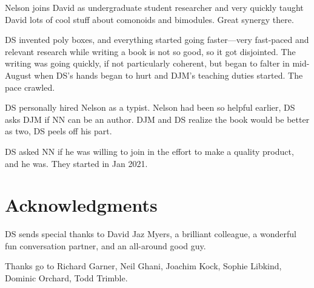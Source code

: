 \documentclass[Book-Poly]{subfiles}
\begin{document}
Nelson joins David as undergraduate student researcher and very quickly taught David lots of cool stuff about comonoids and bimodules. Great synergy there. 

DS invented poly boxes, and everything started going faster---very fast-paced and relevant research while writing a book is not so good, so it got disjointed. The writing was going quickly, if not particularly coherent, but began to falter in mid-August when DS's hands began to hurt and DJM's teaching duties started. The pace crawled. 

DS personally hired Nelson as a typist. Nelson had been so helpful earlier, DS asks DJM if NN can be an author. DJM and DS realize the book would be better as two, DS peels off his part. 

DS asked NN if he was willing to join in the effort to make a quality product, and he was. They started in Jan 2021.

\section*{Acknowledgments}



DS sends special thanks to David Jaz Myers, a brilliant colleague, a wonderful fun conversation partner, and an all-around good guy. 

Thanks go to Richard Garner, Neil Ghani, Joachim Kock, Sophie Libkind, Dominic Orchard, Todd Trimble.
\end{document}
